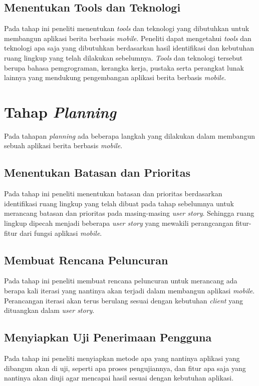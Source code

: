 \begin{spacing}{2}
    \subsection{Menentukan Tools dan Teknologi}
      Pada tahap ini peneliti menentukan \emph{tools} dan teknologi yang dibutuhkan untuk membangun aplikasi berita berbasis \emph{mobile}. Peneliti dapat mengetahui \emph{tools} dan teknologi apa saja yang dibutuhkan berdasarkan hasil identifikasi dan kebutuhan ruang lingkup yang telah dilakukan sebelumnya. \emph{Tools} dan teknologi tersebut berupa bahasa pemgrograman, kerangka kerja, pustaka serta perangkat lunak lainnya yang mendukung pengembangan aplikasi berita berbasis \emph{mobile}.

  \section{Tahap \emph{Planning}}
    Pada tahapan \emph{planning} ada beberapa langkah yang dilakukan dalam membangun sebuah aplikasi berita berbasis \emph{mobile}.

    \subsection{Menentukan Batasan dan Prioritas}
      Pada tahap ini peneliti menentukan batasan dan prioritas berdasarkan identifikasi ruang lingkup yang telah dibuat pada tahap sebelumnya untuk merancang batasan dan prioritas pada masing-masing \emph{user story}. Sehingga ruang lingkup dipecah menjadi beberapa \emph{user story} yang mewakili perangcangan fitur-fitur dari fungsi aplikasi \emph{mobile}.

    \subsection{Membuat Rencana Peluncuran}
      Pada tahap ini peneliti membuat rencana peluncuran untuk merancang ada berapa kali iterasi yang nantinya akan terjadi dalam membangun aplikasi \emph{mobile}. Perancangan iterasi akan terus berulang sesuai dengan kebutuhan \emph{client} yang dituangkan dalam \emph{user story}.

    \subsection{Menyiapkan Uji Penerimaan Pengguna}
      Pada tahap ini peneliti menyiapkan metode apa yang nantinya aplikasi yang dibangun akan di uji, seperti apa proses pengujiannya, dan fitur apa saja yang nantinya akan diuji agar mencapai hasil sesuai dengan kebutuhan aplikasi.


\end{spacing}
